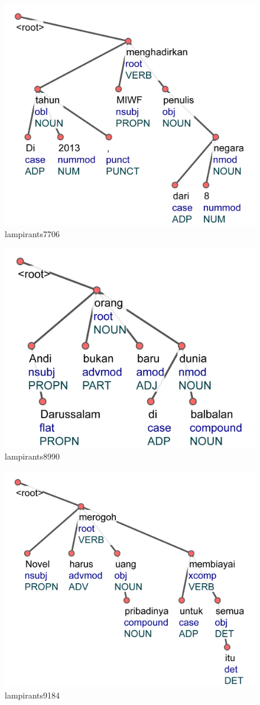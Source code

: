 \begin{figure}
	\centering \includegraphics[width=0.8
	\textwidth] {pics/lampiran/lampirants7706.jpg} 
	\caption{lampirants7706} 
	\label{fig:lampirants7706} 
\end{figure}


\begin{figure}
	\centering \includegraphics[width=0.8
	\textwidth] {pics/lampiran/lampirants8990.jpg} 
	\caption{lampirants8990} 
	\label{fig:lampirants8990} 
\end{figure}

\begin{figure}
	\centering \includegraphics[width=0.8
	\textwidth] {pics/lampiran/lampirants9184.jpg} 
	\caption{lampirants9184} 
	\label{fig:lampirants9184} 
\end{figure}
